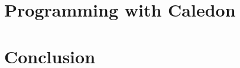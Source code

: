 \documentclass[hyperref={pdfpagelabels=false}]{beamer}
\begin{document}
\part[Programming]{Programming with Caledon}
%    
%    
  
\part[Conclusion]{Conclusion}
%   
%   









\end{document}
